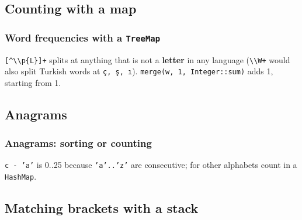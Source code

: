 \documentclass[aspectratio=169,10pt,compress]{beamer}
\begin{document}

\subsection[Map]{Counting with a map}




\begin{frame}[t,fragile] \frametitle{Word frequencies with a \texttt{TreeMap}}

  \vspace{0.3em}
  \small \texttt{[\textasciicircum\textbackslash\textbackslash p\{L\}]+} splits at anything that is not a \textbf{letter} in any language
  (\texttt{\textbackslash\textbackslash W+} would also split Turkish words at \texttt{ç, ş, ı}).
  \texttt{merge(w, 1, Integer::sum)} adds 1, starting from 1.
\end{frame}

\subsection[Anagram]{Anagrams}




\begin{frame}[t,fragile] \frametitle{Anagrams: sorting or counting}

  \vspace{0.3em}
  \small \texttt{c - 'a'} is 0..25 because \texttt{'a'..'z'} are consecutive; for other alphabets count in a \texttt{HashMap}.
\end{frame}

\subsection[Stack]{Matching brackets with a stack}
\end{document}
